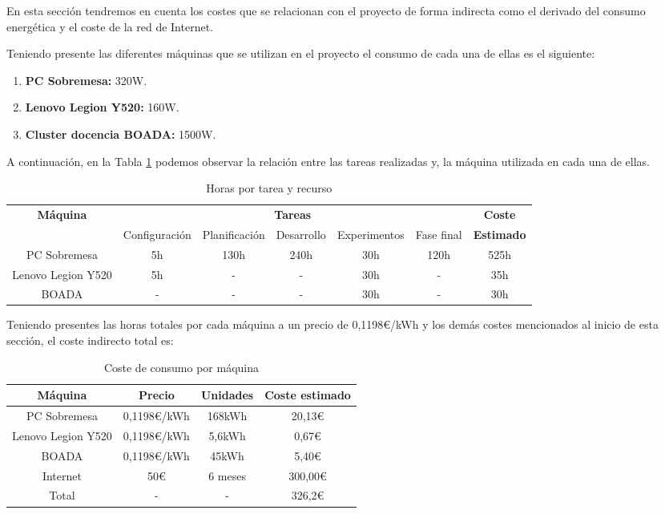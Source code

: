 \documentclass[titlepage,12pt]{report}
\begin{document}
En esta sección tendremos en cuenta los costes que se relacionan con el proyecto de forma indirecta como el derivado del consumo energética y el coste de la red de Internet.

Teniendo presente las diferentes máquinas que se utilizan en el proyecto el consumo de cada una de ellas es el siguiente:

\begin{enumerate}
	\item \textbf{PC Sobremesa:} 320W.
	\item \textbf{Lenovo Legion Y520:} 160W.
	\item \textbf{Cluster docencia BOADA:} 1500W.
\end{enumerate}

A continuación, en la Tabla \ref{ci_1} podemos observar la relación entre las tareas realizadas y, la máquina utilizada en cada una de ellas.

\begin{table}[H]
	\centering
	\begin{tabular}{|c|c|c|c|c|c|c|}
	\hline
	\multirow{2}{*}{\textbf{Máquina}} & \multicolumn{5}{c|}{\textbf{Tareas}} & \textbf{Coste} \\ \cline{2-6} 
			& Configuración & Planificación & Desarrollo & Experimentos & Fase final & \textbf{Estimado} \\ \hline \hline
		PC Sobremesa 			& 5h  & 130h & 240h & 30h &	120h & 525h \\ \hline
		Lenovo Legion Y520 		& 5h  & -	 & -    & 30h &	-	 & 35h\\ \hline
		BOADA 					& -	  & -	 & -    & 30h &	-	 & 30h\\ \hline
	\end{tabular}
	\caption{Horas por tarea y recurso}
	\label{ci_1}
\end{table}

Teniendo presentes las horas totales por cada máquina a un precio de 0,1198€/kWh y los demás costes mencionados al inicio de esta sección, el coste indirecto total es:

\begin{table}[H]
	\centering
	\begin{tabular}{|c|c|c|c|}
		\hline
		\textbf{Máquina} & \textbf{Precio} & \textbf{Unidades} & \textbf{Coste estimado} \\ \hline \hline
		PC Sobremesa 			& 0,1198€/kWh & 168kWh 	& 20,13€ 	\\ \hline
		Lenovo Legion Y520 		& 0,1198€/kWh & 5,6kWh 	& 0,67€ 	\\ \hline
		BOADA 					& 0,1198€/kWh & 45kWh 	& 5,40€ 	\\ \hline 
		Internet				& 50€		  & 6 meses	& 300,00€ 	\\ \hline \hline
		Total 					& - 		  & -		& 326,2€	\\ \hline
	\end{tabular}
	\caption{Coste de consumo por máquina}
	\label{ci2}
\end{table}
\end{document}
